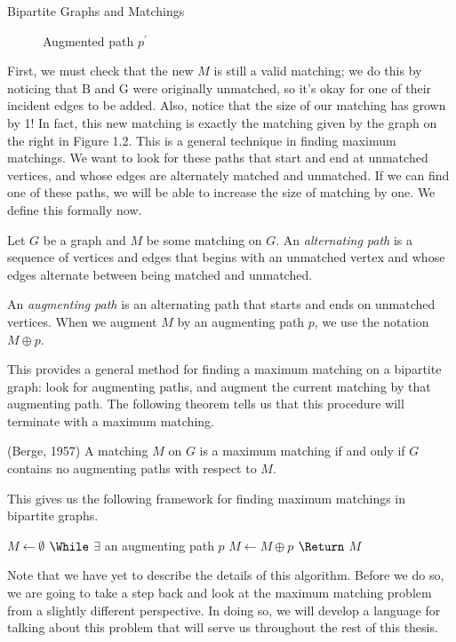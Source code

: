 \begin{section}{Bipartite Graphs and Matchings}
\begin{figure}[h]
		\caption{Augmented path $p^{'}$}
	\end{figure}
	First, we must check that the new $M$ is still a valid matching; we do this by noticing that 
	$\mbox{B}$ and $\mbox{G}$ were originally unmatched, so it's okay for one of their incident 
	edges to be 
	added. Also, notice that the size of our matching has grown by 1! In fact, this new matching 
	is exactly the matching given by the graph on the right in Figure 1.2. 
	This is a general technique in 
	finding maximum matchings. We want to look for these paths that start and end at unmatched 
	vertices, and whose edges are alternately matched and unmatched. If we can find one of these 
	paths, we will be able to increase the size of matching by one. We define this formally now.
	\begin{definition}
		Let $G$ be a graph and $M$ be some matching on $G$. An \emph{alternating path} is a 
		sequence of vertices and edges that begins with an unmatched vertex and whose 
		edges alternate between being matched and unmatched.
	\end{definition}
	\begin{definition}
		An \emph{augmenting path} is an alternating path that starts and ends on unmatched 
		vertices. When we augment $M$ by an augmenting path $p$, we use the notation 
		$M\oplus p$.
	\end{definition}
	This provides a general method for finding a maximum matching on a bipartite graph: 
	look for augmenting paths, and augment the current matching by that augmenting 
	path. The following theorem tells us that this procedure will terminate with a maximum 
	matching.
	\begin{theorem}{(Berge, 1957)}
		A matching $M$ on $G$ is a maximum matching if and only if $G$ contains no augmenting 
		paths with respect to $M$.
	\end{theorem}
	This gives us the following framework for finding maximum matchings in bipartite graphs.
		\begin{codebox}
			\li $M \gets \emptyset $
			\li $\While$ $\exists$ an augmenting path $p$
				\Do
			\li		$M \gets M\oplus p$
				\End
			\li $\Return$ $M$
		\end{codebox}

	Note that we have yet to describe the details of this algorithm. Before we do so, we are going 
	to take a step back and look at the maximum matching problem from a slightly different 
	perspective. In doing so, we will develop a language for talking about this problem that will 
	serve us throughout the rest of this thesis.
\end{section}

